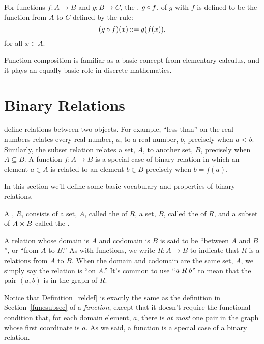\begin{definition}\label{func_compose_def}
  For functions $f:A \to B$ and $g:B \to C$, the ,
  $g \circ f$, of $g$ with $f$ is defined to be the function
  from $A$ to $C$ defined by the rule:
\begin{displaymath}
(g \circ f)(x) \mathbin{::=} g(f(x)),
\end{displaymath}
for all $x \in A$.
\end{definition}

Function composition is familiar as a basic concept from elementary
calculus, and it plays an equally basic role in discrete mathematics.

\section{Binary Relations}\label{rel_sec}

 define relations between two objects.  For
example, ``less-than'' on the real numbers relates every real number, $a$,
to a real number, $b$, precisely when $a < b$. Similarly, the subset
relation relates a set, $A$, to another set, $B$, precisely when $A
\subseteq B$.  A function $f:A \to B$ is a special case of binary relation
in which an element $a \in A$ is related to an element $b \in B$ precisely
when $b = f(a)$.

In this section we'll define some basic vocabulary and properties of binary
relations.

\begin{definition}\label{reldef}
A , $R$, consists of a set, $A$, called
the  of $R$, a set, $B$, called the  of $R$, and
a subset of $A \times B$ called the .
\end{definition}

A relation whose domain is $A$ and codomain is $B$ is said to be ``between
$A$ and $B$'', or ``from $A$ to $B$.''  As with functions, we write $R: A
\to B$ to indicate that $R$ is a relations from $A$ to $B$.  When the
domain and codomain are the same set, $A$, we simply say the
 relation is ``on $A$.''  It's common to use
 ``$a \mathrel{R} b$'' to mean that the pair $(a,b)$ is
in the graph of $R$.

Notice that Definition~\ref{reldef} is exactly the same as the definition
in Section~\ref{funcsubsec} of a {\emph{function}}, except that it doesn't
require the functional condition that, for each domain element, $a$, there
is \emph{at most} one pair in the graph whose first coordinate is $a$.  As
we said, a function is a special case of a binary relation.

